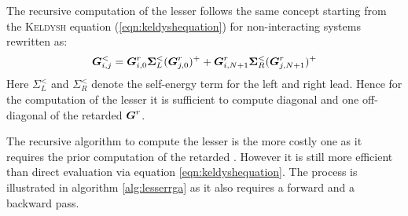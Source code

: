 The recursive computation of the lesser \gfnc{} follows the same concept starting from the \textsc{Keldysh} equation (\ref{eqn:keldyshequation}) for non-interacting systems rewritten as:
\begin{align}
\boldsymbol{G}^<_{i,j} = \boldsymbol{G}^r_{i,0}\boldsymbol{\Sigma}^<_L(\boldsymbol{G}^r_{j,0})^++\boldsymbol{G}^r_{i,N+1}\boldsymbol{\Sigma}^<_R(\boldsymbol{G}^r_{j,N+1})^+
\end{align}
Here $\Sigma^<_L$ and $\Sigma^<_R$ denote the self-energy term  for the left and right lead. Hence for the computation of the lesser \gfnc{} it is sufficient to compute diagonal and one off-diagonal of the retarded \gfnc{} $\boldsymbol{G}^r$.\par
The recursive algorithm to compute the lesser \gfnc{} is the more costly one as it requires the prior computation of the retarded \gfnc{}. However it is still more efficient than direct evaluation via equation \ref{eqn:keldyshequation}. The process is illustrated in algorithm \ref{alg:lesserrga} as it also requires a forward and a backward pass.\par
